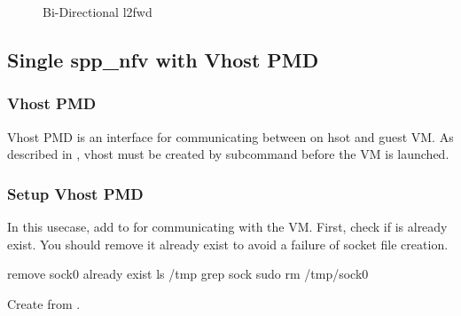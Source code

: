 \documentclass[a4paper,11pt,openany,oneside,english]{sphinxmanual}
\begin{document}
\begin{figure}[htbp]
\centering
\capstart

\noindent{}
\caption{Bi-Directional l2fwd}\label{\detokenize{usecases/spp_nfv:id5}}\label{\detokenize{usecases/spp_nfv:figure-spp-bi-directional-l2fwd}}\end{figure}


\subsection{Single spp\_nfv with Vhost PMD}
\label{\detokenize{usecases/spp_nfv:single-spp-nfv-with-vhost-pmd}}

\subsubsection{Vhost PMD}
\label{\detokenize{usecases/spp_nfv:vhost-pmd}}
Vhost PMD is an interface for communicating between on hsot and guest VM.
As described in
{\hyperref[\detokenize{gsg/howto_use:spp-gsg-howto-use}]{}},
vhost must be created by  subcommand before the VM is launched.


\subsubsection{Setup Vhost PMD}
\label{\detokenize{usecases/spp_nfv:setup-vhost-pmd}}
In this usecase, add  to  for communicating
with the VM.
First, check if  is already exist.
You should remove it already exist to avoid a failure of socket file
creation.

\begin{sphinxVerbatim}[commandchars=\\\{\},formatcom=\footnotesize]
 remove sock0  already exist
 ls /tmp  grep sock
 sudo rm /tmp/sock0
\end{sphinxVerbatim}

Create  from .

\begin{sphinxVerbatim}[commandchars=\\\{\},formatcom=\footnotesize]
\end{sphinxVerbatim}
\end{document}
